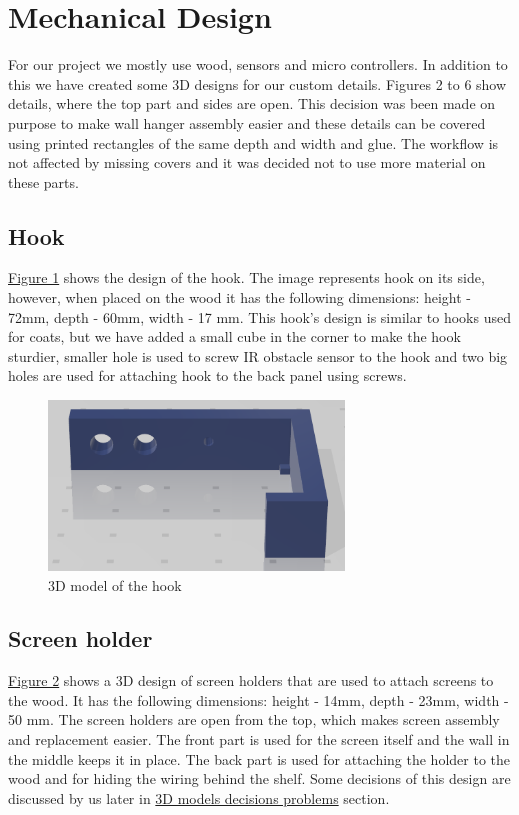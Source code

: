\documentclass{article}
\begin{document}
\section{Mechanical Design}
\label{sec:mechanical}
For our project we mostly use wood, sensors and micro controllers. In addition to this we have created some 3D designs for our custom details. Figures 2 to 6 show details, where the top part and sides are open. This decision was been made on purpose to make wall hanger assembly easier and these details can be covered using printed rectangles of the same depth and width and glue. The workflow is not affected by missing covers and it was decided not to use more material on these parts. 

\subsection{Hook}
\hyperref[fig:hook]{Figure 1} shows the design of the hook. The image represents hook on its side, however, when placed on the wood it has the following dimensions: height - 72mm, depth - 60mm, width - 17 mm. This hook's design is similar to hooks used for coats, but we have added a small cube in the corner to make the hook sturdier, smaller hole is used to screw IR obstacle sensor to the hook and two big holes are used for attaching hook to the back panel using screws.
\begin{figure}[H]
    \begin{center}
        \includegraphics[width=0.7\textwidth]{3d/hook.png}
    \end{center}
    \caption{3D model of the hook}
    \label{fig:hook}
\end{figure}

\subsection{Screen holder}
\hyperref[fig:screen]{Figure 2} shows a 3D design of screen holders that are used to attach screens to the wood. It has the following dimensions: height - 14mm, depth - 23mm, width - 50 mm. The screen holders are open from the top, which makes screen assembly and replacement easier. The front part is used for the screen itself and the wall in the middle keeps it in place. The back part is used for attaching the holder to the wood and for hiding the wiring behind the shelf. Some decisions of this design are discussed by us later in \hyperref[sec:3dproblems]{3D models decisions problems} section.
\end{document}
